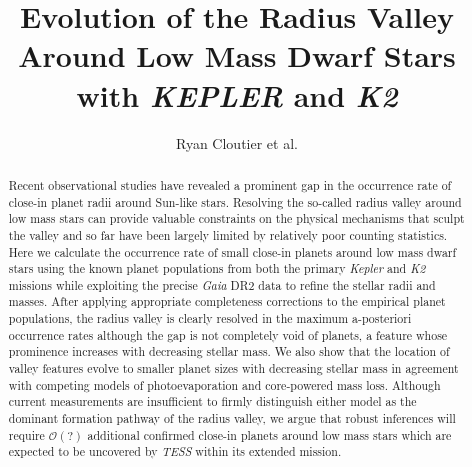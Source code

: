 \documentclass[twocolumn]{emulateapj}
\newcommand{\gaia}[1]{\emph{Gaia}#1}
\newcommand{\kepler}[1]{\emph{Kepler}#1}
\newcommand{\ktwo}[1]{\emph{K2}#1}
\newcommand{\tess}[1]{\emph{TESS}#1}
\begin{document}
\title{Evolution of the Radius Valley Around Low Mass Dwarf Stars with \emph{KEPLER} and \emph{K2}}
\author{Ryan Cloutier et al.}



\begin{abstract}
  Recent observational studies have revealed a prominent gap in the occurrence rate
  of close-in planet radii around Sun-like stars.
  Resolving the so-called radius valley around low mass stars can provide valuable
  constraints on the physical mechanisms that sculpt the valley and so far have been largely limited
  by relatively poor counting statistics.
  Here we calculate the occurrence rate of small close-in planets around low mass dwarf stars
  using the known planet populations from both the primary \kepler{} and \ktwo{} missions while
  exploiting the precise \gaia{} DR2 data to refine the stellar radii and masses. 
  After applying appropriate completeness corrections to the empirical planet populations,
  the radius valley is clearly resolved in the maximum a-posteriori occurrence rates although
  the gap is not completely void of planets, a feature whose prominence increases with
  decreasing stellar mass. We also show that the location of valley features evolve to smaller
  planet sizes with decreasing stellar mass in agreement with competing models of photoevaporation
  and core-powered mass loss. Although current measurements are insufficient to
  firmly distinguish either model as the dominant formation pathway of the radius valley,
  we argue that robust inferences will require $\mathcal{O}(\mathbf{?})$
  additional confirmed close-in planets around low mass stars which are expected to be
  uncovered by \tess{} within its extended mission.
\end{abstract}
\end{document}
